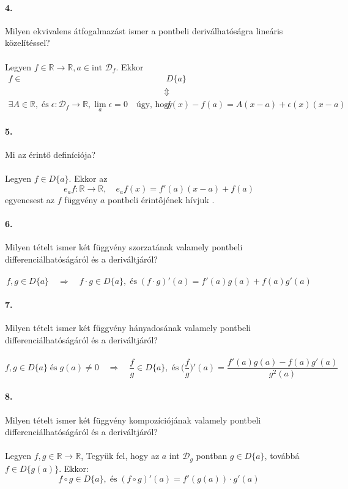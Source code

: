 \documentclass[10pt,a4paper]{article}
\renewcommand{\>}{\rightarrow}
\begin{document}
\paragraph{4.}
Milyen ekvivalens átfogalmazást ismer a pontbeli deriválhatóságra lineáris közelítéssel? \\
\\
Legyen $f \in \mathbb{R} \rightarrow \mathbb{R}, a \in \text{int } \mathcal{D}_f$. Ekkor
\[
\begin{split}
f \in & \; D\{a\} \\
& \Updownarrow \\
\exists A \in \mathbb{R}, \; \text{és} \; \epsilon : \mathcal{D}_f \rightarrow \mathbb{R}, \lim_a{\epsilon} = 0 \quad \text{úgy, hogy } & \; f(x)- f(a) = A(x-a)+\epsilon (x)(x-a)
\end{split}
\]
\paragraph{5.}
Mi az érintő definíciója? \\ \\
Legyen $f \in D\{a\}$. Ekkor az 
\[
e_af:\mathbb{R} \rightarrow \mathbb{R}, \quad	 e_af(x) =f'(a)(x-a)+f(a)
\]
egyenesest az $f$ függvény $a$ pontbeli érintőjének hívjuk .
\paragraph{6.}
Milyen tételt ismer két függvény szorzatának valamely pontbeli differenciálhatóságáról és a deriváltjáról? \\ \\
\[
f,g \in D\{a\} \quad \Longrightarrow \quad f \cdot g \in D\{a\}, \; \text{és} \; (f \cdot g)'(a) =f'(a)g(a)+f(a)g'(a)
\]
\paragraph{7.}
Milyen tételt ismer két függvény hányadosának valamely pontbeli differenciálhatóságáról és a deriváltjáról? \\ \\
\[
f,g \in D\{a\}  \; \text{és} \; g(a) \neq 0 \quad \Longrightarrow \quad \frac{f}{g} \in D\{a\}, \; \text{és} \; \Big( \frac{f}{g} \Big) '(a) = \frac{f'(a)g(a)-f(a)g'(a)}{g^2(a)}  
\]
\paragraph{8.}
Milyen tételt ismer két függvény kompozíciójának valamely pontbeli differenciálhatóságáról és a deriváltjáról? \\ \\
Legyen $f,g \in \mathbb{R} \rightarrow \mathbb{R}$, Tegyük fel, hogy az $a$ int $\mathcal{D}_g$ pontban $g \in D\{a\}$, továbbá $f\in D\{g(a)\}$. Ekkor:
\[
f \circ g \in D\{a\}, \; \text{és} \; (f \circ g)' (a) = f'(g(a)) \cdot g'(a)
\]
\end{document}
